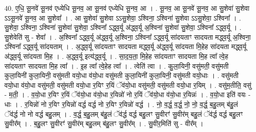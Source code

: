 \documentclass[17pt]{extarticle}
\begin{document}
40. ए॒धि॒ सू॒नवे॑ सू॒नव॑ एध्येधि सू॒नव॒ आ सू॒नव॑ एध्येधि सू॒नव॒ आ । . सू॒नव॒ आ सू॒नवे॑ सू॒नव॒ आ सु॒शेवा॑ सु॒शेवा ऽऽसू॒नवे॑ सू॒नव॒ आ सु॒शेवा᳚ । . आ सु॒शेवा॑ सु॒शेवा ऽऽसु॒शेवा॒ ऽश्विना॒ ऽश्विना॑ सु॒शेवा ऽऽसु॒शेवा॒ ऽश्विना᳚ । . सु॒शेवा॒ ऽश्विना॒ ऽश्विना॑ सु॒शेवा॑ सु॒शेवा॒ ऽश्विना᳚ ऽद्ध्व॒र्यू अ॑द्ध्व॒र्यू अ॒श्विना॑ सु॒शेवा॑ सु॒शेवा॒ ऽश्विना᳚ ऽद्ध्व॒र्यू । . सु॒शेवेति॑ सु - शेवा᳚ । . अ॒श्विना᳚ ऽद्ध्व॒र्यू अ॑द्ध्व॒र्यू अ॒श्विना॒ ऽश्विना᳚ ऽद्ध्व॒र्यू सा॑दयताꣳ सादयता मद्ध्व॒र्यू अ॒श्विना॒ ऽश्विना᳚ ऽद्ध्व॒र्यू सा॑दयताम् । . अ॒द्ध्व॒र्यू सा॑दयताꣳ सादयता मद्ध्व॒र्यू अ॑द्ध्व॒र्यू सा॑दयता मि॒हेह सा॑दयता मद्ध्व॒र्यू अ॑द्ध्व॒र्यू सा॑दयता मि॒ह । . अ॒द्ध्व॒र्यू इत्य॑द्ध्व॒र्यू । . सा॒द॒य॒ता॒ मि॒हेह सा॑दयताꣳ सादयता मि॒ह त्वा᳚ त्वे॒ह सा॑दयताꣳ सादयता मि॒ह त्वा᳚ । . इ॒ह त्वा᳚ त्वे॒हेह त्वा᳚ । . त्वेति॑ त्वा । . कु॒ला॒यिनी॒ वसु॑मती॒ वसु॑मती कुला॒यिनी॑ कुला॒यिनी॒ वसु॑मती वयो॒धा व॑यो॒धा वसु॑मती कुला॒यिनी॑ कुला॒यिनी॒ वसु॑मती वयो॒धाः । . वसु॑मती वयो॒धा व॑यो॒धा वसु॑मती॒ वसु॑मती वयो॒धा र॒यिꣳ र॒यिं ॅव॑यो॒धा वसु॑मती॒ वसु॑मती वयो॒धा र॒यिम् । . वसु॑म॒तीति॒ वसु॑ - म॒ती॒ । . व॒यो॒धा र॒यिꣳ र॒यिं ॅव॑यो॒धा व॑यो॒धा र॒यिन्नो॑ नो र॒यिं ॅव॑यो॒धा व॑यो॒धा र॒यिन्नः॑ । . व॒यो॒धा इति॑ वयः - धाः । . र॒यिन्नो॑ नो र॒यिꣳ र॒यिन्नो॑ वर्द्ध वर्द्ध नो र॒यिꣳ र॒यिन्नो॑ वर्द्ध । . नो॒ व॒र्द्ध॒ व॒र्द्ध॒ नो॒ नो॒ व॒र्द्ध॒ ब॒हु॒लम् ब॑हु॒लं ॅव॑र्द्ध नो नो वर्द्ध बहु॒लम् । . व॒र्द्ध॒ ब॒हु॒लम् ब॑हु॒लं ॅव॑र्द्ध वर्द्ध बहु॒लꣳ सु॒वीरꣳ॑ सु॒वीर॑म् बहु॒लं ॅव॑र्द्ध वर्द्ध बहु॒लꣳ सु॒वीर᳚म् । . ब॒हु॒लꣳ सु॒वीरꣳ॑ सु॒वीर॑म् बहु॒लम् ब॑हु॒लꣳ सु॒वीर᳚म् । . सु॒वीर॒मिति॑ सु - वीर᳚म् । \newline
\pagebreak
{}
\end{document}
